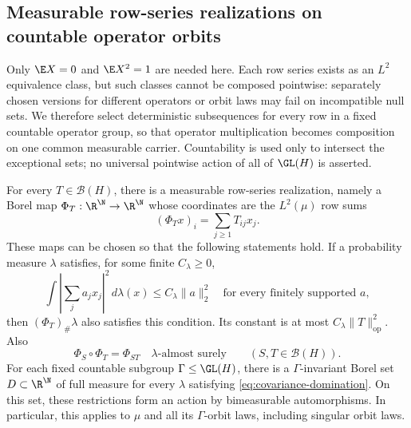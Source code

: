 \subsection{Measurable row-series realizations on countable operator orbits}
\label{sec:measurable-realization}

Only \(\E X=0\) and \(\E X^2=1\) are needed here.  Each row series exists as
an \(L^2\) equivalence class, but such classes cannot be composed pointwise:
separately chosen versions for different operators or orbit laws may fail on
incompatible null sets.  We therefore select deterministic subsequences for
every row in a fixed countable operator group, so that operator multiplication
becomes composition on one common measurable carrier.  Countability is used
only to intersect the exceptional sets; no universal pointwise action of all of
\(\GL(H)\) is asserted.

\begin{lemma}
\label{lem:measurable-row-series-realization}
For every \(T\in\mathcal B(H)\), there is a measurable row-series
realization, namely a Borel map
\(\Phi_T:\R^{\N}\to\R^{\N}\) whose coordinates are the \(L^2(\mu)\) row sums
\[
  (\Phi_Tx)_i=\sum_{j\geq1}T_{ij}x_j.
\]
These maps can be chosen so that the following statements hold.
If a probability measure \(\lambda\) satisfies, for some finite
\(C_\lambda\geq0\),
\begin{equation}
  \int\left|\sum_j a_jx_j\right|^2\,d\lambda(x)
  \leq C_\lambda\|a\|_2^2
  \quad\text{for every finitely supported }a,
  \label{eq:covariance-domination}
\end{equation}
then \((\Phi_T)_\#\lambda\) also satisfies this condition.
Its constant is at most \(C_\lambda\|T\|_{\mathrm{op}}^2\).  Also
\begin{equation}
  \Phi_S\circ\Phi_T=\Phi_{ST}
  \quad\lambda\text{-almost surely}
  \qquad(S,T\in\mathcal B(H)).
  \label{eq:measurable-composition}
\end{equation}
For each fixed countable subgroup \(\Gamma\leq\GL(H)\),
there is a \(\Gamma\)-invariant Borel set \(D\subset\R^{\N}\) of full
measure for every \(\lambda\) satisfying
\eqref{eq:covariance-domination}.
On this set, these restrictions form an action by bimeasurable
automorphisms.
In particular, this applies to \(\mu\) and all its \(\Gamma\)-orbit laws,
including singular orbit laws.
\end{lemma}


